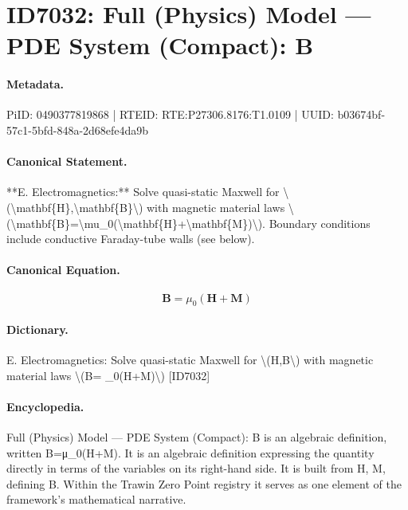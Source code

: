 \section*{ID7032: Full (Physics) Model — PDE System (Compact): B}
\paragraph{Metadata.}
PiID: 0490377819868 | RTEID: RTE:P27306.8176:T1.0109 | UUID: b03674bf-57c1-5bfd-848a-2d68efe4da9b

\paragraph{Canonical Statement.}
**E. Electromagnetics:** Solve quasi-static Maxwell for \textbackslash{}(\textbackslash{}mathbf\{H\},\textbackslash{}mathbf\{B\}\textbackslash{}) with magnetic material laws \textbackslash{}(\textbackslash{}mathbf\{B\}=\textbackslash{}mu\_0(\textbackslash{}mathbf\{H\}+\textbackslash{}mathbf\{M\})\textbackslash{}). Boundary conditions include conductive Faraday-tube walls (see below).

\paragraph{Canonical Equation.}
\[
\mathbf{B}=\mu_0(\mathbf{H}+\mathbf{M})
\]

\paragraph{Dictionary.}
E. Electromagnetics: Solve quasi-static Maxwell for \textbackslash{}(H,B\textbackslash{}) with magnetic material laws \textbackslash{}(B= \_0(H+M)\textbackslash{}) [ID7032]

\paragraph{Encyclopedia.}
Full (Physics) Model — PDE System (Compact): B is an algebraic definition, written B=μ\_0(H+M). It is an algebraic definition expressing the quantity directly in terms of the variables on its right-hand side. It is built from H, M, defining B. Within the Trawin Zero Point registry it serves as one element of the framework's mathematical narrative.

